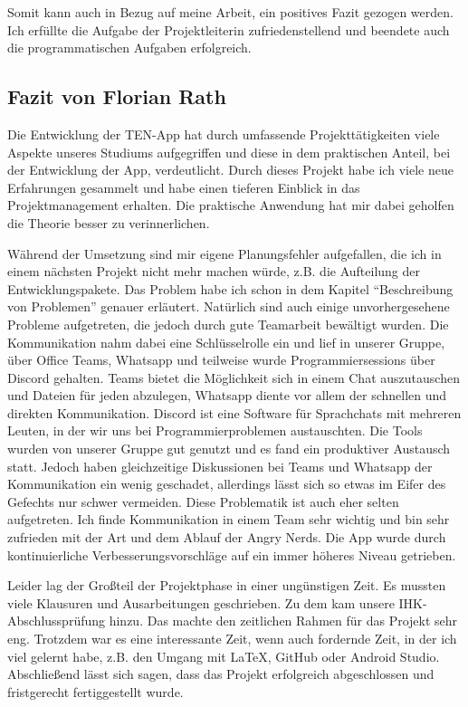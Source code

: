 Somit kann auch in Bezug auf meine Arbeit, ein positives Fazit gezogen werden. Ich erfüllte die Aufgabe der Projektleiterin zufriedenstellend und beendete auch die programmatischen Aufgaben erfolgreich.

\subsection{Fazit von Florian Rath}

Die Entwicklung der TEN-App hat durch umfassende Projekttätigkeiten viele Aspekte unseres Studiums aufgegriffen und diese in dem praktischen Anteil, bei der Entwicklung der App, verdeutlicht. Durch dieses Projekt habe ich viele neue Erfahrungen gesammelt und habe einen tieferen Einblick in das Projektmanagement erhalten. Die praktische Anwendung hat mir dabei geholfen die Theorie besser zu verinnerlichen.

Während der Umsetzung sind mir eigene Planungsfehler aufgefallen, die ich in einem nächsten Projekt nicht mehr machen würde, z.B. die Aufteilung der Entwicklungspakete. Das Problem habe ich schon in dem Kapitel “Beschreibung von Problemen” genauer erläutert. Natürlich sind auch einige unvorhergesehene Probleme aufgetreten, die jedoch durch gute Teamarbeit bewältigt wurden. Die Kommunikation nahm dabei eine Schlüsselrolle ein und lief in unserer Gruppe, über Office Teams, Whatsapp und teilweise wurde Programmiersessions über Discord gehalten. Teams bietet die Möglichkeit sich in einem Chat auszutauschen und Dateien für jeden abzulegen, Whatsapp diente vor allem der schnellen und direkten Kommunikation. Discord ist eine Software für Sprachchats mit mehreren Leuten, in der wir uns bei Programmierproblemen austauschten. Die Tools wurden von unserer Gruppe gut genutzt und es fand ein produktiver Austausch statt. Jedoch haben gleichzeitige Diskussionen bei Teams und Whatsapp der Kommunikation ein wenig geschadet, allerdings lässt sich so etwas im Eifer des Gefechts nur schwer vermeiden. Diese Problematik ist auch eher selten aufgetreten. Ich finde Kommunikation in einem Team sehr wichtig und bin sehr zufrieden mit der Art und dem Ablauf der Angry Nerds. Die App wurde durch kontinuierliche Verbesserungsvorschläge auf ein immer höheres Niveau getrieben.

Leider lag der Großteil der Projektphase in einer ungünstigen Zeit. Es mussten viele Klausuren und Ausarbeitungen geschrieben. Zu dem kam unsere IHK-Abschlussprüfung hinzu. Das machte den zeitlichen Rahmen für das Projekt sehr eng. Trotzdem war es eine interessante Zeit, wenn auch fordernde Zeit, in der ich viel gelernt habe, z.B. den Umgang mit LaTeX, GitHub oder Android Studio. Abschließend lässt sich sagen, dass das Projekt erfolgreich abgeschlossen und fristgerecht fertiggestellt wurde.


